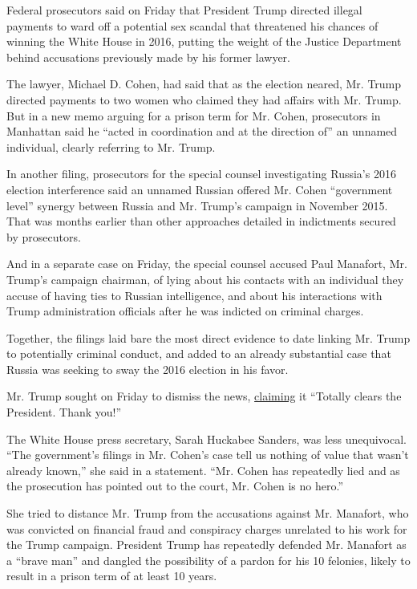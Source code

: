 Federal prosecutors said on Friday that President Trump directed illegal
payments to ward off a potential sex scandal that threatened his chances
of winning the White House in 2016, putting the weight of the Justice
Department behind accusations previously made by his former lawyer.

The lawyer, Michael D. Cohen, had said that as the election neared, Mr.
Trump directed payments to two women who claimed they had affairs with
Mr. Trump. But in a new memo arguing for a prison term for Mr. Cohen,
prosecutors in Manhattan said he ``acted in coordination and at the
direction of'' an unnamed individual, clearly referring to Mr. Trump.

In another filing, prosecutors for the special counsel investigating
Russia's 2016 election interference said an unnamed Russian offered Mr.
Cohen ``government level'' synergy between Russia and Mr. Trump's
campaign in November 2015. That was months earlier than other approaches
detailed in indictments secured by prosecutors.

And in a separate case on Friday, the special counsel accused Paul
Manafort, Mr. Trump's campaign chairman, of lying about his contacts
with an individual they accuse of having ties to Russian intelligence,
and about his interactions with Trump administration officials after he
was indicted on criminal charges.

Together, the filings laid bare the most direct evidence to date linking
Mr. Trump to potentially criminal conduct, and added to an already
substantial case that Russia was seeking to sway the 2016 election in
his favor.

Mr. Trump sought on Friday to dismiss the news,
\href{https://twitter.com/realDonaldTrump/status/1071177621445230596}{claiming}
it ``Totally clears the President. Thank you!''

The White House press secretary, Sarah Huckabee Sanders, was less
unequivocal. ``The government's filings in Mr. Cohen's case tell us
nothing of value that wasn't already known,'' she said in a statement.
``Mr. Cohen has repeatedly lied and as the prosecution has pointed out
to the court, Mr. Cohen is no hero.''

She tried to distance Mr. Trump from the accusations against Mr.
Manafort, who was convicted on financial fraud and conspiracy charges
unrelated to his work for the Trump campaign. President Trump has
repeatedly defended Mr. Manafort as a ``brave man'' and dangled the
possibility of a pardon for his 10 felonies, likely to result in a
prison term of at least 10 years.

